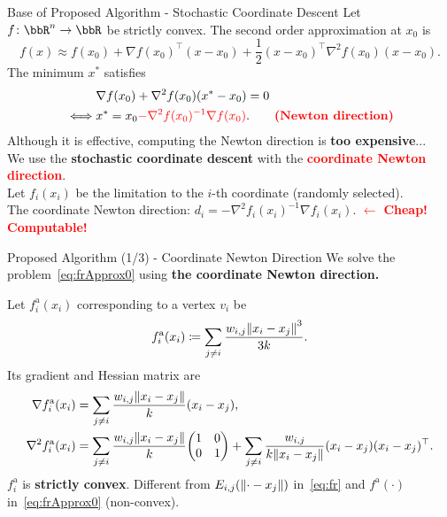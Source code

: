 \documentclass[dvipdfmx,13pt,aspectratio=169]{beamer}
\newcommand{\red}[1]{\textcolor{red}{#1}}
\newcommand{\defeq}{\coloneqq}
\newif\ifShowHidden
\begin{document}
\begin{frame}{Base of Proposed Algorithm - Stochastic Coordinate Descent}
  Let $f\colon \bbR^n \to \bbR$ be strictly convex. The second order approximation at $x_0$ is
  \begin{equation*}
    f(x) \approx f(x_0) + \nabla f(x_0)^\top (x - x_0) + \frac{1}{2} (x - x_0)^\top \nabla^2 f(x_0) (x - x_0).
  \end{equation*}
  The minimum $x^*$ satisfies
  \begin{align*}
         & \nabla f(x_0) + \nabla^2 f(x_0) (x^* - x_0) = 0                                                       \\
    \iff & x^* = x_0 \red{- \nabla^2 f(x_0)^{-1} \nabla f(x_0)}. \qquad \text{\textbf{\red{(Newton direction)}}}
  \end{align*}
  Although it is effective, computing the Newton direction is \textbf{too expensive}...\\[1em]

  We use the \large{\textbf{stochastic coordinate descent}} with the \large{\textbf{\red{coordinate Newton direction}}}.\\
  Let $f_i(x_i)$ be the limitation to the $i$-th coordinate (randomly selected).\\
  The coordinate Newton direction: $d_i = -\nabla^2 f_i(x_i)^{-1} \nabla f_i(x_i)$. \red{$\leftarrow$ \large{\textbf{Cheap! Computable!}}}
\end{frame}

\begin{frame}{Proposed Algorithm (1/3) - Coordinate Newton Direction}
  We solve the problem~\eqref{eq:frApprox0} using \textbf{the coordinate Newton direction.}

  Let $f^{\mathrm{a}}_i(x_i)$ corresponding to a vertex $v_i$ be
  \begin{equation*}
    f^{\mathrm{a}}_i(x_i) \defeq \sum_{j \neq i} \frac{w_{i,j}\norm{x_i - x_j}^3}{3k}.
  \end{equation*}
  Its gradient and Hessian matrix are
  \begin{align*}
    \nabla f^{\mathrm{a}}_i(x_i)   & = \sum_{j \neq i} \frac{w_{i,j}\norm{x_i - x_j}}{k} (x_i - x_j),     \\
    \nabla^2 f^{\mathrm{a}}_i(x_i) & = \sum_{j \neq i} \frac{w_{i,j}\norm{x_i - x_j}}{k} \mqty(1      & 0 \\0&1) + \sum_{j \neq i} \frac{w_{i,j}}{k\norm{x_i - x_j}} (x_i - x_j)(x_i - x_j)^\top.
  \end{align*}
  $f^{\mathrm{a}}_i$ is \textbf{strictly convex}.
  Different from $E_{i,j}(\norm{\cdot - x_j})$ in~\eqref{eq:fr} and $f^{\mathrm{a}}(\cdot)$ in~\eqref{eq:frApprox0} (non-convex).
\end{frame}
\end{document}
